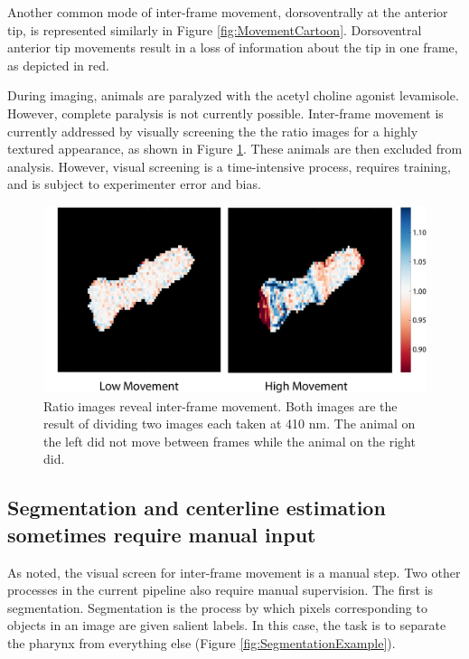 Another common mode of inter-frame movement, dorsoventrally at the anterior tip, is represented similarly in Figure \ref{fig:MovementCartoon}. Dorsoventral anterior tip movements result in a loss of information about the tip in one frame, as depicted in red.

During imaging, animals are paralyzed with the acetyl choline agonist levamisole. However, complete paralysis is not currently possible. Inter-frame movement is currently addressed by visually screening the the ratio images for a highly textured appearance, as shown in Figure \ref{fig:HighMovement}. These animals are then excluded from analysis. However, visual screening is a time-intensive process, requires training, and is subject to experimenter error and bias.

\begin{figure}[ht]
    \centering
    \includegraphics[scale=0.3]{Figures/rendered_files/low_high_movement}
    \decoRule
    \caption[A ratio image reveals inter-frame movement]{Ratio images reveal inter-frame movement. Both images are the result of dividing two images each taken at 410 nm. The animal on the left did not move between frames while the animal on the right did.}
    \label{fig:HighMovement}
\end{figure}

\subsection{Segmentation and centerline estimation sometimes require manual input} \label{limitationManual}

As noted, the visual screen for inter-frame movement is a manual step. Two other processes in the current pipeline also require manual supervision. The first is segmentation. Segmentation is the process by which pixels corresponding to objects in an image are given salient labels. In this case, the task is to separate the pharynx from everything else (Figure \ref{fig:SegmentationExample}). 

